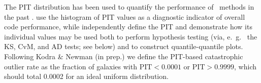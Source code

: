The PIT distribution has been used to quantify the performance of \pzpdf\ methods in the past \citep[e.~g.~][]{Bordoloi:10,Polsterer:16,Tanaka:17}.
\citet{Tanaka:17} use the histogram of PIT values as a diagnostic indicator of overall code performance, while \citet{Freeman:17} independently define the PIT and demonstrate how its individual values may be used both to perform hypothesis testing (via, e.~g.~ the KS, CvM, and AD tests; see below) and to construct quantile-quantile plots.
Following Kodra \& Newman (in prep.) we define the PIT-based catastrophic outlier rate as the fraction of galaxies with $\mathrm{PIT} < 0.0001$ or $\mathrm{PIT} > 0.9999$, which should total 0.0002 for an ideal uniform distribution.



